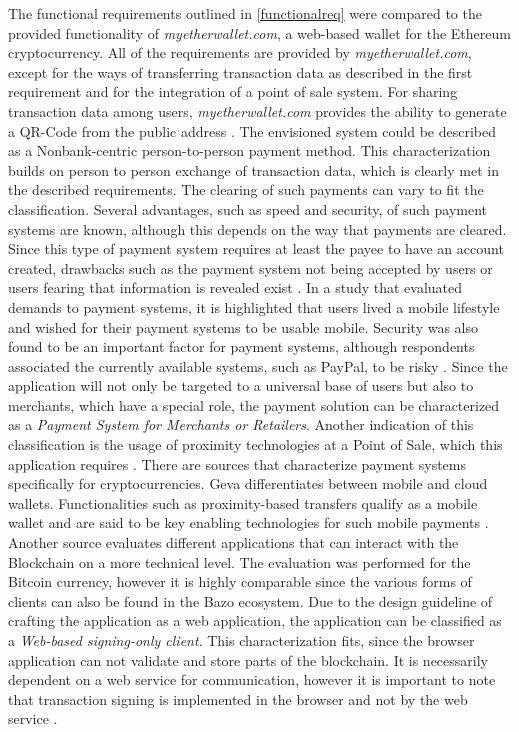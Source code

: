 The functional requirements outlined in \ref{functionalreq} were compared to %
the provided functionality of \textit{myetherwallet.com}, a web-based wallet for the Ethereum cryptocurrency. All of the requirements are provided by \textit{myetherwallet.com}, except for the ways of transferring transaction data as described in the first requirement and for the integration of a point of sale system. For sharing transaction data among users, \textit{myetherwallet.com} provides the ability to generate a QR-Code from the public address \cite{myethwallet}. %
The envisioned system could be described as a Nonbank-centric person-to-person payment method. This characterization builds on person to person exchange of transaction data, which is clearly met in the described requirements. The clearing of such payments can vary to fit the classification. %
Several advantages, such as speed and security, of such payment systems are known, although this depends on the way that payments are cleared. Since this type of payment system requires at least the payee to have an account created, drawbacks such as the payment system not being accepted by users or users fearing that information is revealed exist \cite{p2ppayments}. 
In a study that evaluated demands to payment systems, it is highlighted that users lived a mobile lifestyle and wished for their payment systems to be usable mobile. Security was also found to be an important factor for payment systems, although respondents associated the currently available systems, such as PayPal, to be risky \cite{p2ppadoption}.
Since the application will not only be targeted to a universal base of users but also to merchants, which have a special role, the payment solution can be characterized as a  \textit{Payment System for Merchants or Retailers}.
Another indication of this classification is the usage of proximity technologies at a Point of Sale, which this application requires \cite{p2ptypes}.
There are sources that characterize payment systems specifically for cryptocurrencies. Geva differentiates between mobile and cloud wallets. Functionalities such as proximity-based transfers qualify as a mobile wallet and are said to be key enabling technologies for such mobile payments \cite{bitcoinmobile}.
Another source evaluates different applications that can interact with the Blockchain on a more technical level. The evaluation was performed for the Bitcoin currency, however it is highly comparable since the various forms of clients can also be found in the Bazo ecosystem.
Due to the design guideline of crafting the application as a web application, the application can be classified as a \textit{ Web-based signing-only client}. This characterization fits, since the browser application can not validate and store parts of the blockchain. It is necessarily dependent on a web service for communication, however it is important to note that transaction signing is implemented in the browser and not by the web service \cite{bitcoinclients}. 

